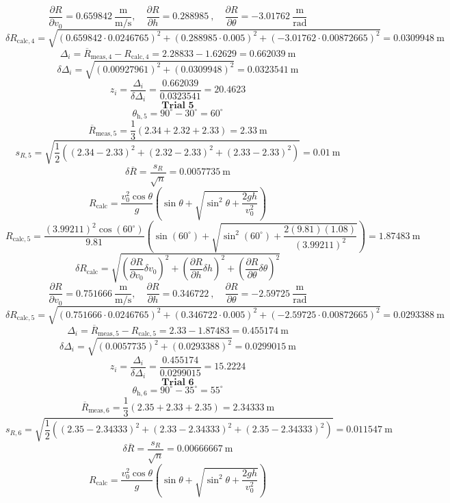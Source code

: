 \documentclass[11pt]{article}
\begin{document}
\[
\frac{\partial R}{\partial v_0} = 0.659842\ \frac{\mathrm{m}}{\mathrm{m/s}},\quad \frac{\partial R}{\partial h} = 0.288985\ ,\quad \frac{\partial R}{\partial \theta} = -3.01762\ \frac{\mathrm{m}}{\mathrm{rad}}
\]
\[
\delta R_{\mathrm{calc},4} = \sqrt{(0.659842\cdot 0.0246765)^2 + (0.288985\cdot 0.005)^2 + (-3.01762\cdot 0.00872665)^2} = 0.0309948\ \mathrm{m}
\]
\[
\Delta_i = \overline{R}_{\mathrm{meas},4} - R_{\mathrm{calc},4} = 2.28833 - 1.62629 = 0.662039\ \mathrm{m}
\]
\[
\delta \Delta_i = \sqrt{(0.00927961)^2 + (0.0309948)^2} = 0.0323541\ \mathrm{m}
\]
\[
z_i = \frac{\Delta_i}{\delta \Delta_i} = \frac{0.662039}{0.0323541} = 20.4623
\]
\[
\textbf{Trial 5}
\]
\[
\theta_{\mathrm{h},5} = 90^\circ - 30^\circ = 60^\circ
\]
\[
\overline{R}_{\mathrm{meas},5} = \frac{1}{3}\left(2.34 + 2.32 + 2.33\right) = 2.33\ \mathrm{m}
\]
\[
s_{R,5} = \sqrt{\frac{1}{2}\left((2.34 - 2.33)^2 + (2.32 - 2.33)^2 + (2.33 - 2.33)^2\right)} = 0.01\ \mathrm{m}
\]
\[
\delta \overline{R} = \dfrac{s_R}{\sqrt{n}} = 0.0057735\ \mathrm{m}
\]
\[
R_{\mathrm{calc}} = \frac{v_0^2\cos\theta}{g}\left(\sin\theta + \sqrt{\sin^2\theta + \frac{2gh}{v_0^2}}\right)
\]
\[
R_{\mathrm{calc},5} = \frac{(3.99211)^2\cos(60^\circ)}{9.81}\left(\sin(60^\circ) + \sqrt{\sin^2(60^\circ) + \frac{2(9.81)(1.08)}{(3.99211)^2}}\right) = 1.87483\ \mathrm{m}
\]
\[
\delta R_{\mathrm{calc}} = \sqrt{\left(\frac{\partial R}{\partial v_0}\delta v_0\right)^2 + \left(\frac{\partial R}{\partial h}\delta h\right)^2 + \left(\frac{\partial R}{\partial \theta}\delta \theta\right)^2}
\]
\[
\frac{\partial R}{\partial v_0} = 0.751666\ \frac{\mathrm{m}}{\mathrm{m/s}},\quad \frac{\partial R}{\partial h} = 0.346722\ ,\quad \frac{\partial R}{\partial \theta} = -2.59725\ \frac{\mathrm{m}}{\mathrm{rad}}
\]
\[
\delta R_{\mathrm{calc},5} = \sqrt{(0.751666\cdot 0.0246765)^2 + (0.346722\cdot 0.005)^2 + (-2.59725\cdot 0.00872665)^2} = 0.0293388\ \mathrm{m}
\]
\[
\Delta_i = \overline{R}_{\mathrm{meas},5} - R_{\mathrm{calc},5} = 2.33 - 1.87483 = 0.455174\ \mathrm{m}
\]
\[
\delta \Delta_i = \sqrt{(0.0057735)^2 + (0.0293388)^2} = 0.0299015\ \mathrm{m}
\]
\[
z_i = \frac{\Delta_i}{\delta \Delta_i} = \frac{0.455174}{0.0299015} = 15.2224
\]
\[
\textbf{Trial 6}
\]
\[
\theta_{\mathrm{h},6} = 90^\circ - 35^\circ = 55^\circ
\]
\[
\overline{R}_{\mathrm{meas},6} = \frac{1}{3}\left(2.35 + 2.33 + 2.35\right) = 2.34333\ \mathrm{m}
\]
\[
s_{R,6} = \sqrt{\frac{1}{2}\left((2.35 - 2.34333)^2 + (2.33 - 2.34333)^2 + (2.35 - 2.34333)^2\right)} = 0.011547\ \mathrm{m}
\]
\[
\delta \overline{R} = \dfrac{s_R}{\sqrt{n}} = 0.00666667\ \mathrm{m}
\]
\[
R_{\mathrm{calc}} = \frac{v_0^2\cos\theta}{g}\left(\sin\theta + \sqrt{\sin^2\theta + \frac{2gh}{v_0^2}}\right)
\]
\end{document}
